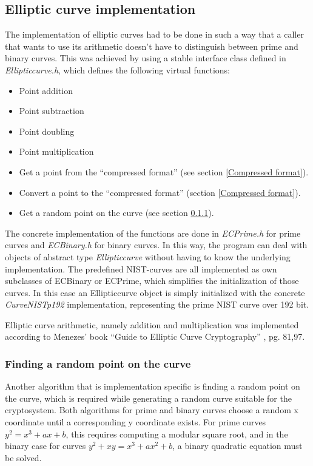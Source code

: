 \documentclass[11pt,english]{article}
\begin{document}
\subsection{Elliptic curve implementation}
The implementation of elliptic curves had to be done in such a way that a caller that wants to use its arithmetic doesn't have to distinguish between prime and binary curves. This was achieved by using a stable interface class defined in \emph{Ellipticcurve.h}, which defines the following virtual functions:

\begin{itemize}
 \item Point addition
 \item Point subtraction
 \item Point doubling
 \item Point multiplication
 \item Get a point from the ``compressed format'' (see section \ref{Compressed format}).
 \item Convert a point to the ``compressed format'' (section \ref{Compressed format}).
 \item Get a random point on the curve (see section \ref{Finding a random point on the curve}).
\end{itemize}

The concrete implementation of the functions are done in \emph{ECPrime.h} for prime curves and \emph{ECBinary.h} for binary curves. In this way, the program can deal with objects of abstract type \emph{Ellipticcurve} without having to know the underlying implementation. The predefined NIST-curves are all implemented as own subclasses of ECBinary or ECPrime, which simplifies the initialization of those curves. In this case an Ellipticcurve object is simply initialized with the concrete \emph{CurveNISTp192} implementation, representing the prime NIST curve over 192 bit.

Elliptic curve arithmetic, namely addition and multiplication was implemented according to Menezes' book ``Guide to Elliptic Curve Cryptography'' \cite{940321}, pg. 81,97.

\subsubsection{Finding a random point on the curve}
\label{Finding a random point on the curve}
Another algorithm that is implementation specific is finding a random point on the curve, which is required while generating a random curve suitable for the cryptosystem. Both algorithms for prime and binary curves choose a random x coordinate until a corresponding y coordinate exists. For prime curves $y^2=x^3+ax+b$, this requires computing a modular square root, and in the binary case for curves $y^2+xy=x^3+ax^2+b$, a binary quadratic equation must be solved.
\end{document}
